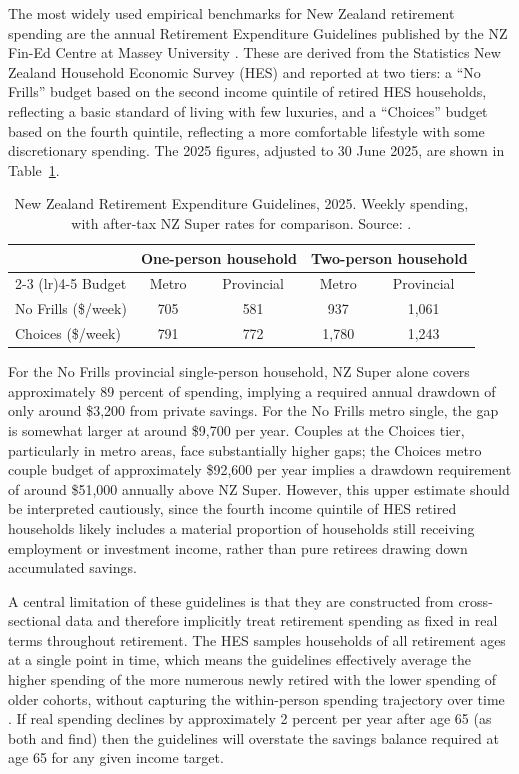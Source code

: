 \documentclass[11pt]{article}
\begin{document}
The most widely used empirical benchmarks for New Zealand retirement spending are the annual Retirement Expenditure Guidelines published by the NZ Fin-Ed Centre at Massey University \parencite{matthews2025guidelines}. These are derived from the Statistics New Zealand Household Economic Survey (HES) and reported at two tiers: a ``No Frills'' budget based on the second income quintile of retired HES households, reflecting a basic standard of living with few luxuries, and a ``Choices'' budget based on the fourth quintile, reflecting a more comfortable lifestyle with some discretionary spending. The 2025 figures, adjusted to 30 June 2025, are shown in Table~\ref{tab:retirementBudgets}.

\begin{table}[htbp]
  \centering
  \caption{New Zealand Retirement Expenditure Guidelines, 2025. Weekly spending, with after-tax NZ Super rates for comparison. Source: \textcite{matthews2025guidelines}.}
  \label{tab:retirementBudgets}
  \begin{tabular}{lcccc}
    \toprule
    & \multicolumn{2}{c}{One-person household} & \multicolumn{2}{c}{Two-person household} \\
    \cmidrule(lr){2-3} \cmidrule(lr){4-5}
    Budget & Metro & Provincial & Metro & Provincial \\
    \midrule
    No Frills (\$/week) & 705 & 581 & 937 & 1{,}061 \\
    Choices (\$/week)   & 791 & 772 & 1{,}780 & 1{,}243 \\
    \bottomrule
  \end{tabular}
\end{table}

For the No Frills provincial single-person household, NZ Super alone covers approximately 89 percent of spending, implying a required annual drawdown of only around \$3,200 from private savings. For the No Frills metro single, the gap is somewhat larger at around \$9,700 per year. Couples at the Choices tier, particularly in metro areas, face substantially higher gaps; the Choices metro couple budget of approximately \$92,600 per year implies a drawdown requirement of around \$51,000 annually above NZ Super. However, this upper estimate should be interpreted cautiously, since the fourth income quintile of HES retired households likely includes a material proportion of households still receiving employment or investment income, rather than pure retirees drawing down accumulated savings.

A central limitation of these guidelines is that they are constructed from cross-sectional data and therefore implicitly treat retirement spending as fixed in real terms throughout retirement. The HES samples households of all retirement ages at a single point in time, which means the guidelines effectively average the higher spending of the more numerous newly retired with the lower spending of older cohorts, without capturing the within-person spending trajectory over time \parencite{riig2024spending}. If real spending declines by approximately 2 percent per year after age 65 (as both \textcite{riig2024spending} and \textcite{le2023expenditure} find) then the guidelines will overstate the savings balance required at age 65 for any given income target.
\end{document}
